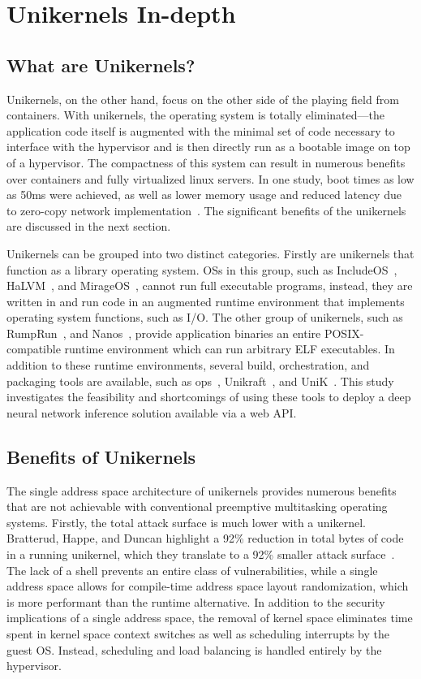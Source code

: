 \documentclass[conference]{IEEEtran}
\begin{document}
\section{Unikernels In-depth}

\subsection{What are Unikernels?}

Unikernels, on the other hand, focus on the other side of the
playing field from containers.  With unikernels, the operating
system is totally eliminated—the application code itself is
augmented with the minimal set of code necessary to interface
with the hypervisor and is then directly run as a bootable image
on top of a hypervisor. The compactness of this system can result
in numerous benefits over containers and fully virtualized linux
servers. In one study, boot times as low as 50ms were achieved,
as well as lower memory usage and reduced latency due to
zero-copy network implementation~\cite{libos}. The significant
benefits of the unikernels are discussed in the next section.

Unikernels can be grouped into two distinct categories. Firstly
are unikernels that function as a library operating system. OSs
in this group, such as IncludeOS~\cite{includeos},
HaLVM~\cite{halvm}, and MirageOS~\cite{mirageos}, cannot run full
executable programs, instead, they are written in and run code in
an augmented runtime environment that implements operating system
functions, such as I/O. The other group of unikernels, such as
RumpRun~\cite{rumprun}, and Nanos~\cite{nanos}, provide
application binaries an entire POSIX-compatible runtime
environment which can run arbitrary ELF executables. In addition
to these runtime environments, several build, orchestration, and
packaging tools are available, such as ops~\cite{nanos},
Unikraft~\cite{unikraft}, and UniK~\cite{unik}. This study
investigates the feasibility and shortcomings of using these
tools to deploy a deep neural network inference solution
available via a web API.\@

\subsection{Benefits of Unikernels}

The single address space architecture of unikernels provides
numerous benefits that are not achievable with conventional
preemptive multitasking operating systems. Firstly, the total
attack surface is much lower with a unikernel. Bratterud, Happe,
and Duncan highlight a 92\% reduction in total bytes of code in a
running unikernel, which they translate to a 92\% smaller attack
surface~\cite{enhancingprivacy}. The lack of a shell prevents an
entire class of vulnerabilities, while a single address space
allows for compile-time address space layout randomization, which
is more performant than the runtime alternative. In addition to
the security implications of a single address space, the removal
of kernel space eliminates time spent in kernel space context
switches as well as scheduling interrupts by the guest OS.\@
Instead, scheduling and load balancing is handled entirely by the
hypervisor.
\end{document}
